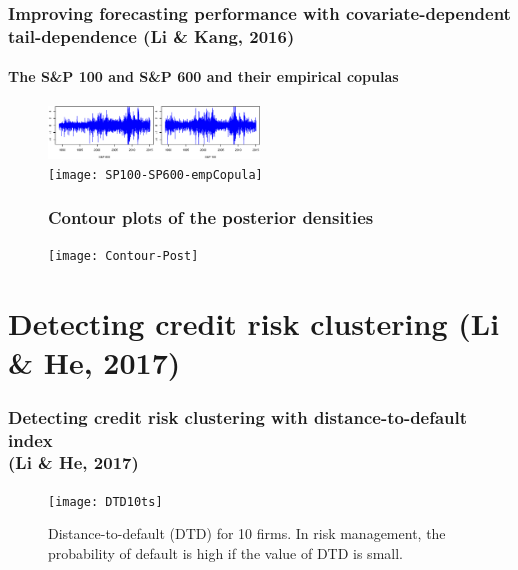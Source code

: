 \documentclass[10pt,aspectratio=169]{beamer}
\begin{document}
\begin{frame}
  \frametitle{Improving forecasting performance with covariate-dependent tail-dependence (Li \&
  Kang, 2016)}
  \framesubtitle{The S\&P 100 and S\&P 600 and their empirical copulas}
 \begin{figure}[!h]
    \centering
    \includegraphics[width=0.5\textwidth]{SP100-SP600}\\
    \texttt{[image: SP100-SP600-empCopula]}
  \end{figure}
\end{frame}

\begin{frame}
  \frametitle{}

  \begin{figure}[!h]
    \frametitle{Contour plots of the posterior densities}
    \centering
    \texttt{[image: Contour-Post]}
  \end{figure}

\end{frame}

\section{Detecting credit risk clustering (Li \& He, 2017)}
\begin{frame}
  \frametitle{Detecting credit risk clustering with distance-to-default index \\(Li \& He,
    2017)}
  \begin{figure}[!h]
    \centering
    \texttt{[image: DTD10ts]}
    \caption{Distance-to-default (DTD) for 10 firms. In risk management, the probability of
      default is high if the value of DTD is small.}
    \label{fig:DTD-for-ten-firms}
  \end{figure}

\end{frame}
\end{document}
